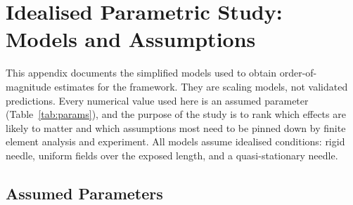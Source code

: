 \documentclass[12pt, a4paper]{article}
\begin{document}
\section{Idealised Parametric Study: Models and Assumptions}
\label{app:param}

This appendix documents the simplified models used to obtain order-of-magnitude estimates for the framework. They are scaling models, not validated predictions. Every numerical value used here is an assumed parameter (Table~\ref{tab:params}), and the purpose of the study is to rank which effects are likely to matter and which assumptions most need to be pinned down by finite element analysis and experiment. All models assume idealised conditions: rigid needle, uniform fields over the exposed length, and a quasi-stationary needle.

\subsection{Assumed Parameters}
\end{document}
